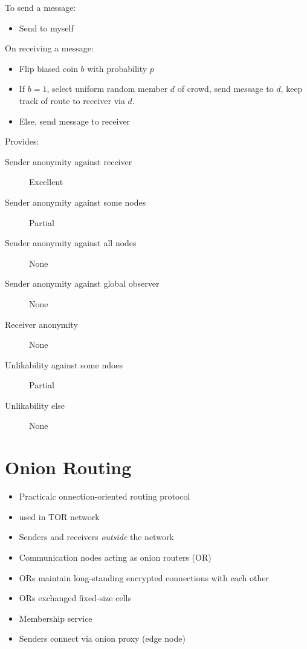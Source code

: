 \documentclass[a4paper]{scrreprt}
\begin{document}
To send a message:
\begin{itemize}
		\item Send to myself
\end{itemize}

On receiving a message:
\begin{itemize}
		\item Flip biased coin $b$ with probability $p$
		\item If $b = 1$, select uniform random member $d$ of crowd, send
				message to $d$, keep track of route to receiver via $d$.
		\item Else, send message to receiver
\end{itemize}

Provides:
\begin{description}
		\item[Sender anonymity against receiver] Excellent
		\item[Sender anonymity against some nodes] Partial
		\item[Sender anonymity against all nodes] None
		\item[Sender anonymity against global observer] None
		\item[Receiver anonymity] None
		\item[Unlikability against some ndoes] Partial
		\item[Unlikability else] None
\end{description}

\section{Onion Routing}

\begin{itemize}
		\item Practicalc onnection-oriented routing protocol
		\item used in TOR network
		\item Senders and receivers \emph{outside} the network
		\item Communication nodes acting as onion routers (OR)
		\item ORs maintain long-standing encrypted connections with each other
		\item ORs exchanged fixed-size cells
		\item Membership service
		\item Senders connect via onion proxy (edge node)
\end{itemize}
\end{document}
